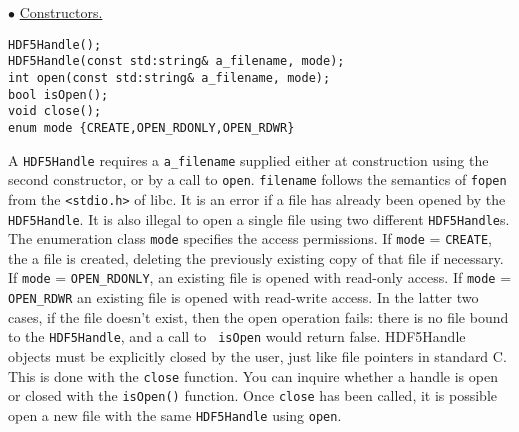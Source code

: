 \begin{trivlist} 
\item $\bullet$
\underline{Constructors.}
\begin{verbatim}
HDF5Handle();
HDF5Handle(const std:string& a_filename, mode);
int open(const std:string& a_filename, mode);
bool isOpen();
void close();
enum mode {CREATE,OPEN_RDONLY,OPEN_RDWR}
\end{verbatim}

A {\tt HDF5Handle} requires a {\tt a\_filename} supplied either 
at construction using the second constructor, or by a call to {\tt open}. 
{\tt filename} follows the semantics of \verb+fopen+ from the 
\verb+<stdio.h>+ of libc.
It is an error if a file has already been
opened by the {\tt HDF5Handle}.
It is also illegal to open a single file using two different 
{\tt HDF5Handle}s. The enumeration class {\tt mode} specifies the access
permissions. If {\tt mode} = {\tt CREATE}, the a file is created,
deleting the previously existing copy of that file if necessary. 
If {\tt mode} = {\tt OPEN\_RDONLY}, an existing file is opened with read-only
access. If {\tt mode} = {\tt OPEN\_RDWR} an existing file is opened with
read-write access. In the latter two cases, if the file doesn't exist,
then the open operation fails: 
there is no file bound to the {\tt HDF5Handle}, and a call to {\tt
isOpen} would return false. 
HDF5Handle objects must be explicitly closed by the user, just
like file pointers in standard C.  This is done with the \verb/close/
function.  You can inquire whether a handle is open or closed
with the \verb/isOpen()/ function.
Once {\tt close} has been called, it is possible open a new file with
the same {\tt HDF5Handle} using {\tt open}.


\end{trivlist}
